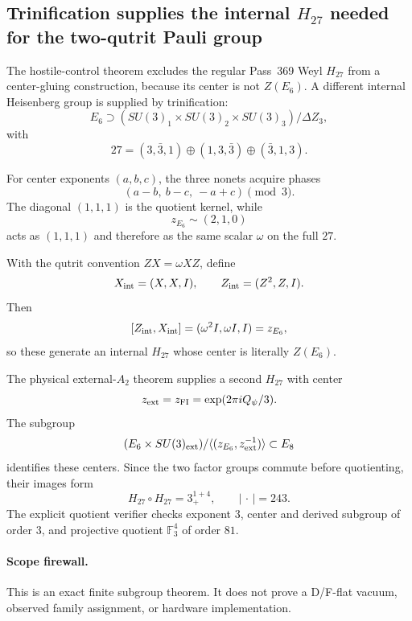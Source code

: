 \subsection*{Trinification supplies the internal $H_{27}$ needed for the two-qutrit Pauli group}

The hostile-control theorem excludes the regular Pass~369 Weyl $H_{27}$ from a center-gluing construction, because its center is not $Z(E_6)$. A different internal Heisenberg group is supplied by trinification:
\[
E_6\supset (SU(3)_1\times SU(3)_2\times SU(3)_3)/\Delta Z_3,
\]
with
\[
27=(3,\bar3,1)\oplus(1,3,\bar3)\oplus(\bar3,1,3).
\]

For center exponents $(a,b,c)$, the three nonets acquire phases
\[
(a-b,\ b-c,\ -a+c)\pmod3.
\]
The diagonal $(1,1,1)$ is the quotient kernel, while
\[
\boxed{z_{E_6}\sim(2,1,0)}
\]
acts as $(1,1,1)$ and therefore as the same scalar $\omega$ on the full $27$.

With the qutrit convention $ZX=\omega XZ$, define
\[
X_{\rm int}=(X,X,I),\qquad
Z_{\rm int}=(Z^2,Z,I).
\]
Then
\[
[Z_{\rm int},X_{\rm int}]
=(\omega^2I,\omega I,I)=z_{E_6},
\]
so these generate an internal $H_{27}$ whose center is literally $Z(E_6)$.

The physical external-$A_2$ theorem supplies a second $H_{27}$ with center
\[
z_{\rm ext}=z_{\rm FI}=\exp(2\pi iQ_\psi/3).
\]
The subgroup
\[
(E_6\times SU(3)_{\rm ext})/
\langle(z_{E_6},z_{\rm ext}^{-1})\rangle
\subset E_8
\]
identifies these centers. Since the two factor groups commute before quotienting, their images form
\[
\boxed{H_{27}\circ H_{27}=3_+^{1+4}},
\qquad
\boxed{|\,\cdot\,|=243}.
\]
The explicit quotient verifier checks exponent $3$, center and derived subgroup of order $3$, and projective quotient $\mathbb F_3^4$ of order $81$.

\paragraph{Scope firewall.}
This is an exact finite subgroup theorem. It does not prove a D/F-flat vacuum, observed family assignment, or hardware implementation.
